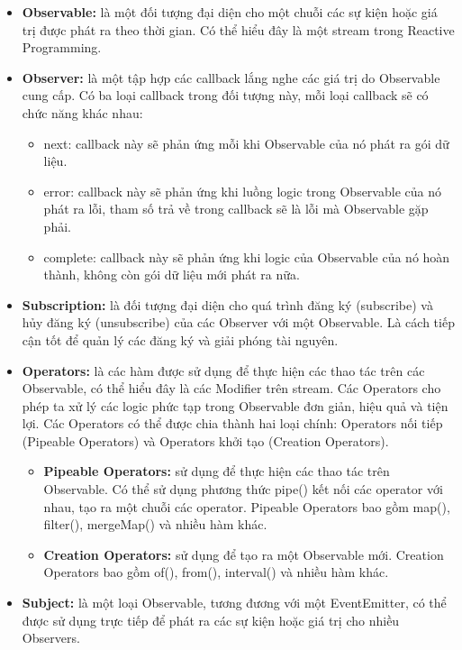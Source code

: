 \begin{itemize}
  \item \textbf{Observable:} là một đối tượng đại diện cho một chuỗi các sự kiện hoặc giá trị được phát ra theo thời gian.  Có thể hiểu đây là một stream trong Reactive Programming.
  \item \textbf{Observer:} là một tập hợp các callback lắng nghe các giá trị do Observable cung cấp.
        Có ba loại callback trong đối tượng này, mỗi loại callback sẽ có chức năng khác nhau:
        \begin{itemize}
          \item next: callback này sẽ phản ứng mỗi khi Observable của nó phát ra gói dữ liệu.
          \item error: callback này sẽ phản ứng khi luồng logic trong Observable của nó phát ra lỗi, tham số trả về trong callback sẽ là lỗi mà Observable gặp phải.
          \item complete: callback này sẽ phản ứng khi logic của Observable của nó hoàn thành, không còn gói dữ liệu mới phát ra nữa.
        \end{itemize}
  \item \textbf{Subscription:} là đối tượng đại diện cho quá trình đăng ký (subscribe) và hủy đăng ký (unsubscribe) của các Observer với một Observable.
        Là cách tiếp cận tốt để quản lý các đăng ký và giải phóng tài nguyên.
  \item \textbf{Operators:} là các hàm được sử dụng để thực hiện các thao tác trên các Observable, có thể hiểu đây là các Modifier trên stream.
        Các Operators cho phép ta xử lý các logic phức tạp trong Observable đơn giản, hiệu quả và tiện lợi.
        Các Operators có thể được chia thành hai loại chính: Operators nối tiếp (Pipeable Operators) và Operators khởi tạo (Creation Operators).
        \begin{itemize}
          \item \textbf{Pipeable Operators:} sử dụng để thực hiện các thao tác trên Observable.
                Có thể sử dụng phương thức pipe() kết nối các operator với nhau, tạo ra một chuỗi các operator.
                Pipeable Operators bao gồm map(), filter(), mergeMap() và nhiều hàm khác.
          \item \textbf{Creation Operators:} sử dụng để tạo ra một Observable mới.
                Creation Operators bao gồm of(), from(), interval() và nhiều hàm khác.
        \end{itemize}
  \item \textbf{Subject:} là một loại Observable, tương đương với một EventEmitter, có thể được sử dụng trực tiếp để phát ra các sự kiện hoặc giá trị cho nhiều Observers.

\end{itemize}

